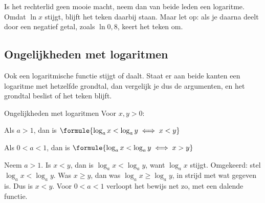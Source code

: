 \begin{oefeningen}
\end{oefeningen}

Is het rechterlid geen mooie macht, neem dan van beide leden een logaritme. Omdat $\ln x$ stijgt, blijft het teken daarbij staan. Maar let op: als je daarna deelt door een negatief getal, zoals $\ln 0{,}8$, keert het teken om.


\begin{oefeningen}
\end{oefeningen}

\subsection{Ongelijkheden met logaritmen}

Ook een logaritmische functie stijgt of daalt. Staat er aan beide kanten een logaritme met hetzelfde grondtal, dan vergelijk je dus de argumenten, en het grondtal beslist of het teken blijft.

\begin{theorie}
\begin{stelling}{Ongelijkheden met logaritmen}
Voor $x, y > 0$:

Als $a > 1$, dan is \qquad $\formule{\log_a x < \log_a y \iff x < y}$

Als $0 < a < 1$, dan is \qquad $\formule{\log_a x < \log_a y \iff x > y}$
\end{stelling}
\begin{bewijs}
Neem $a > 1$. Is $x < y$, dan is $\log_a x < \log_a y$, want $\log_a x$ stijgt. Omgekeerd: stel $\log_a x < \log_a y$. Was $x \geqslant y$, dan was $\log_a x \geqslant \log_a y$, in strijd met wat gegeven is. Dus is $x < y$. Voor $0 < a < 1$ verloopt het bewijs net zo, met een dalende functie.
\end{bewijs}
\end{theorie}

